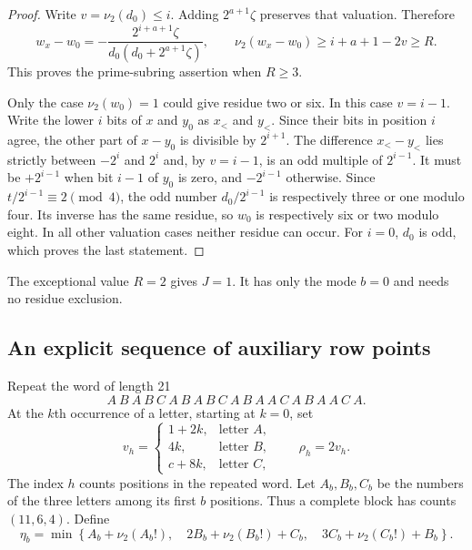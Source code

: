 \begin{proof}
Write $v=\nu_2(d_0)\le i$. Adding $2^{a+1}\zeta$ preserves that
valuation. Therefore
\[
 w_x-w_0=
 -\frac{2^{i+a+1}\zeta}{d_0(d_0+2^{a+1}\zeta)},\qquad
 \nu_2(w_x-w_0)\ge i+a+1-2v\ge R.
\]
This proves the prime-subring assertion when $R\ge3$.

Only the case $\nu_2(w_0)=1$ could give residue two or six. In this
case $v=i-1$. Write the lower $i$ bits of $x$ and $y_0$ as $x_<$
and $y_<$. Since their bits in position $i$ agree, the other part of
$x-y_0$ is divisible by $2^{i+1}$. The difference $x_<-y_<$ lies
strictly between $-2^i$ and $2^i$ and, by $v=i-1$, is an odd
multiple of $2^{i-1}$. It must be $+2^{i-1}$ when bit $i-1$ of
$y_0$ is zero, and $-2^{i-1}$ otherwise. Since
$t/2^{i-1}\equiv2\pmod4$, the odd number
$d_0/2^{i-1}$ is respectively three or one modulo four. Its inverse
has the same residue, so $w_0$ is respectively six or two modulo
eight. In all other valuation cases neither residue can occur.
For $i=0$, $d_0$ is odd, which proves the last statement.
\end{proof}

The exceptional value $R=2$ gives $J=1$. It has only the mode $b=0$
and needs no residue exclusion.

\subsection{An explicit sequence of auxiliary row points}

Repeat the word of length 21
\[
 A\ B\ A\ B\ C\ A\ B\ A\ B\ C\ A\ B\ A\ A\ C\ A\ B\ A\ A\ C\ A.
\]
At the $k$th occurrence of a letter, starting at $k=0$, set
\begin{equation}
 v_h=\begin{cases}
       1+2k,&\text{letter }A,\\
       4k,&\text{letter }B,\\
       c+8k,&\text{letter }C,
     \end{cases}
 \qquad \rho_h=2v_h.
 \label{eq:pivot21-points}
\end{equation}
The index $h$ counts positions in the repeated word. Let $A_b,B_b,C_b$
be the numbers of the three letters among its first $b$ positions.
Thus a complete block has counts $(11,6,4)$. Define
\begin{equation}
 \eta_b=\min\left\{
 A_b+\nu_2(A_b!),\quad
 2B_b+\nu_2(B_b!)+C_b,\quad
 3C_b+\nu_2(C_b!)+B_b
 \right\}.
 \label{eq:pivot21-eta}
\end{equation}

